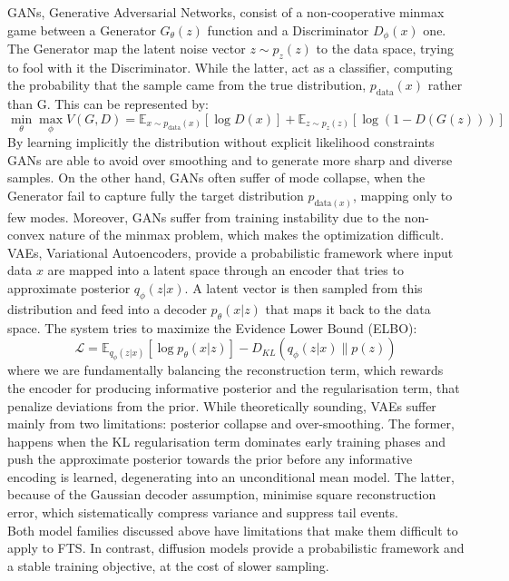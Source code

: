 GANs, Generative Adversarial Networks, consist of a non-cooperative minmax game between a Generator \(G_\theta(z)\) function and a Discriminator \(D_\phi(x)\) one. The Generator map the latent noise vector \(z\sim p_z(z)\) to the data space, trying to fool with it the Discriminator. While the latter, act as a classifier, computing the probability that the sample came from the true distribution, \(p_{\text{data}}(x)\) rather than G. This can be represented by: $$\min_\theta \max_\phi V(G,D)=\mathbb{E}_{x\sim p_{\text{data}}(x)}\left[\log D(x)\right]+\mathbb{E}_{z\sim p_z(z)}\left[\log \left(1-D(G(z))\right)\right]$$
By learning implicitly the distribution without explicit likelihood constraints GANs are able to avoid over smoothing and to generate more sharp and diverse samples. On the other hand, GANs often suffer of mode collapse, when the Generator fail to capture fully the target distribution \(p_{\text{data}(x)}\), mapping only to few modes. Moreover, GANs suffer from training instability due to the non-convex nature of the minmax problem, which makes the optimization difficult.\\

VAEs, Variational Autoencoders, provide a probabilistic framework where input data \(x\) are mapped into a latent space through an encoder that tries to approximate posterior \(q_\phi(z|x)\). A latent vector is then sampled from this distribution and feed into a decoder \(p_\theta(x|z)\) that maps it back to the data space. The system tries to maximize the Evidence Lower Bound (ELBO):$$\mathcal{L}=\mathbb{E}_{q_\phi(z|x)}\left[\log p_\theta(x|z)\right]-D_{KL}\left(q_\phi(z|x)\|p(z)\right)$$
where we are fundamentally balancing the reconstruction term, which rewards the encoder for producing informative posterior and the regularisation term, that penalize deviations from the prior. While theoretically sounding, VAEs suffer mainly from two limitations: posterior collapse and over-smoothing. The former, happens when the KL regularisation term dominates early training phases and push the approximate posterior towards the prior before any informative encoding is learned, degenerating into an unconditional mean model. The latter, because of the Gaussian decoder assumption, minimise square reconstruction error, which sistematically compress variance and suppress tail events.\\

Both model families discussed above have limitations that make them difficult to apply to FTS. In contrast, diffusion models provide a probabilistic framework and a stable training objective, at the cost of slower sampling.

